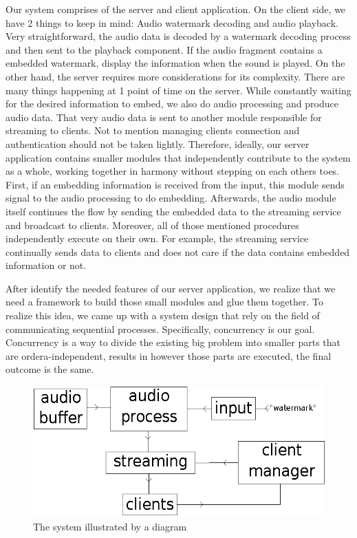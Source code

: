 \documentclass[conference]{IEEEtran}
\begin{document}
Our system comprises of the server and client application. On the client side, we have 2 things to keep in mind: Audio watermark decoding and audio playback. Very straightforward, the audio data is decoded by a watermark decoding process and then sent to the playback component. If the audio fragment contains a embedded watermark, display the information when the sound is played. On the other hand, the server requires more considerations for its complexity. There are many things happening at 1 point of time on the server. While constantly waiting for the desired information to embed, we also do audio processing and produce audio data. That very audio data is sent to another module responsible for streaming to clients. Not to mention managing clients connection and authentication should not be taken lightly. Therefore, ideally, our server application contains smaller modules that independently contribute to the system as a whole, working together in harmony without stepping on each others toes. First, if an embedding information is received from the input, this module sends signal to the audio processing to do embedding. Afterwards, the audio module itself continues the flow by sending the embedded data to the streaming service and broadcast to clients. Moreover, all of those mentioned procedures independently execute on their own. For example, the streaming service continually sends data to clients and does not care if the data contains embedded information or not. 

After identify the needed features of our server application, we realize that we need a framework to build those small modules and glue them together. To realize this idea, we came up with a system design that rely on the field of communicating sequential processes. Specifically, concurrency is our goal. Concurrency is a way to divide the existing big problem into smaller parts that are ordera-independent, results in however those parts are executed, the final outcome is the same. 

\begin{figure}
  \includegraphics{drawing.eps}
  \caption{The system illustrated by a diagram}

\end{figure}
\end{document}
